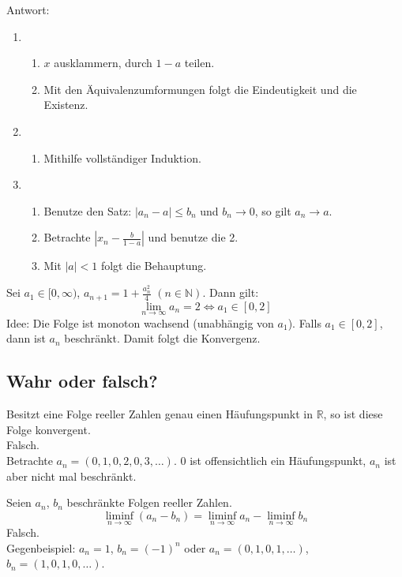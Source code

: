 Antwort:
\begin{enumerate}
    \item
    \begin{enumerate}
        \item $x$ ausklammern, durch $1-a$ teilen.
        \item Mit den Äquivalenzumformungen folgt die Eindeutigkeit und die Existenz.
    \end{enumerate}
    \item
    \begin{enumerate}
        \item Mithilfe vollständiger Induktion.
    \end{enumerate}
    \item
    \begin{enumerate}
        \item Benutze den Satz: $|a_n - a| \leq b_n$ und $b_n \to 0$, so gilt $a_n \to a$.
        \item Betrachte $|x_n - \frac{b}{1-a}|$ und benutze die 2.
        \item Mit $|a| < 1$ folgt die Behauptung.
    \end{enumerate}
\end{enumerate}

Sei $a_1 \in [0, \infty)$, $a_{n + 1} = 1 + \frac{a_n^2}{4}$ $(n \in \mathbb{N})$.
Dann gilt:
\begin{displaymath}
  \lim_{n \to \infty} a_n = 2 \iff a_1 \in [0,2]
\end{displaymath}
Idee: Die Folge ist monoton wachsend (unabhängig von $a_1$).
Falls $a_1 \in [0,2]$, dann ist $a_n$ beschränkt.
Damit folgt die Konvergenz.

\subsection{Wahr oder falsch?}
Besitzt eine Folge reeller Zahlen genau einen Häufungspunkt in $\mathbb{R}$, so ist diese Folge konvergent.\\
Falsch.\\
Betrachte $a_n = (0,1,0,2,0,3,\dots)$. $0$ ist offensichtlich ein Häufungspunkt, $a_n$ ist aber nicht mal beschränkt.

Seien $a_n$, $b_n$ beschränkte Folgen reeller Zahlen.
\begin{displaymath}
  \liminf_{n \to \infty} (a_n - b_n) = \liminf_{n \to \infty} a_n - \liminf_{n \to \infty} b_n
\end{displaymath}
Falsch.\\
Gegenbeispiel: $a_n = 1$, $b_n = (-1)^n$ oder $a_n = (0,1,0,1,\dots)$, $b_n = (1,0,1,0,\dots)$.

